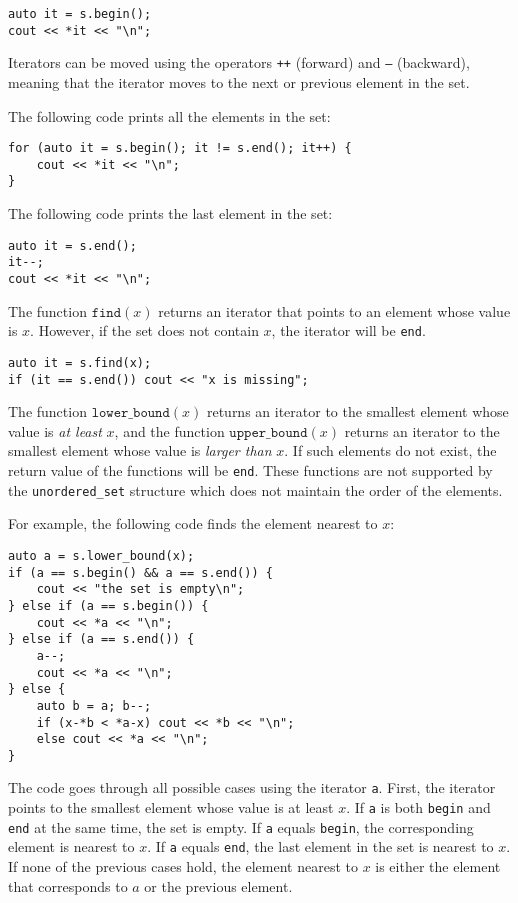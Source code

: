\begin{lstlisting}
auto it = s.begin();
cout << *it << "\n";
\end{lstlisting}

Iterators can be moved using the operators
\texttt{++} (forward) and \texttt{--} (backward),
meaning that the iterator moves to the next
or previous element in the set.

The following code prints all the elements in the set:
\begin{lstlisting}
for (auto it = s.begin(); it != s.end(); it++) {
    cout << *it << "\n";
}
\end{lstlisting}
The following code prints the last element in the set:
\begin{lstlisting}
auto it = s.end();
it--;
cout << *it << "\n";
\end{lstlisting}

The function $\texttt{find}(x)$ returns an iterator
that points to an element whose value is $x$.
However, if the set does not contain $x$,
the iterator will be \texttt{end}.

\begin{lstlisting}
auto it = s.find(x);
if (it == s.end()) cout << "x is missing";
\end{lstlisting}

The function $\texttt{lower\_bound}(x)$ returns
an iterator to the smallest element
whose value is \emph{at least} $x$, and
the function $\texttt{upper\_bound}(x)$
returns an iterator to the smallest element
whose value is \emph{larger than} $x$.
If such elements do not exist,
the return value of the functions will be \texttt{end}.
These functions are not supported by the
\texttt{unordered\_set} structure which
does not maintain the order of the elements.

\begin{samepage}
For example, the following code finds the element
nearest to $x$:

\begin{lstlisting}
auto a = s.lower_bound(x);
if (a == s.begin() && a == s.end()) {
    cout << "the set is empty\n";
} else if (a == s.begin()) {
    cout << *a << "\n";
} else if (a == s.end()) {
    a--;
    cout << *a << "\n";
} else {
    auto b = a; b--;
    if (x-*b < *a-x) cout << *b << "\n";
    else cout << *a << "\n";
}
\end{lstlisting}

The code goes through all possible cases
using the iterator \texttt{a}.
First, the iterator points to the smallest
element whose value is at least $x$.
If \texttt{a} is both \texttt{begin}
and \texttt{end} at the same time, the set is empty.
If \texttt{a} equals \texttt{begin},
the corresponding element is nearest to $x$.
If \texttt{a} equals \texttt{end},
the last element in the set is nearest to $x$.
If none of the previous cases hold,
the element nearest to $x$ is either the
element that corresponds to $a$ or the previous element.
\end{samepage}

